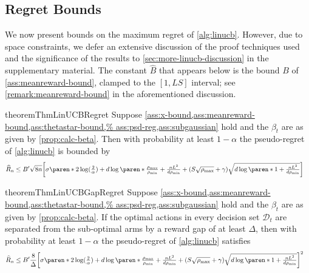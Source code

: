 \documentclass{article}
\DeclarePairedDelimiter{\paren}()
\DeclarePairedDelimiter{\brck}{[}{]}
\newcommand{\D}{\mathcal{D}}
\begin{document}
\vspace{-5pt}
\subsection{Regret Bounds}
\label{sec:regret-bounds}

We now present bounds on the maximum regret of \cref{alg:linucb}.
However, due to space constraints, we defer an extensive discussion of
the proof techniques used and the significance of the results to
\cref{sec:more-linucb-discussion} in the supplementary material.  The
constant $\hat{B}$ that appears below is the bound $B$ of
\cref{ass:meanreward-bound}, clamped to the $[1,LS]$ interval; see \cref{remark:meanreward-bound} in the aforementioned discussion.

\begin{restatable}{theorem}{ThmLinUCBRegret}%
  \label{thm:linucb-regret}%
  Suppose \cref{ass:x-bound,ass:meanreward-bound,ass:thetastar-bound,%
    ass:psd-reg,ass:subgaussian} hold and the
  $\beta_t$ are as given by \cref{prop:calc-beta}.  Then with
  probability at least $1-\alpha$ the pseudo-regret of
  \cref{alg:linucb} is bounded by
    \begin{align}
    \label{eq:regret_general_formula}
    \widehat R_n
    &\le B' \sqrt{8n}\brck[\bigg]{\sigma\paren*{2\log(\tfrac{2}{\alpha})
      + d\log\paren*{\tfrac{\rho_{\max}}{\rho_{\min}} + \tfrac{nL^2}{d\rho_{\min}}}}
      + (S\sqrt{\rho_{\max}} + \gamma)\sqrt{d\log\paren*{1 + \tfrac{nL^2}{d\rho_{\min}}}}}
  \end{align}
\end{restatable}

\begin{restatable}{theorem}{ThmLinUCBGapRegret}%
  \label{thm:linucb-gap-regret}
  Suppose \cref{ass:x-bound,ass:meanreward-bound,ass:thetastar-bound,%
    ass:psd-reg,ass:subgaussian} hold and the
  $\beta_t$ are as given by \cref{prop:calc-beta}.  If the optimal
  actions in every decision set $\D_t$ are separated from the
  sub-optimal arms by a reward gap of at least $\Delta$, then with
  probability at least $1-\alpha$ the pseudo-regret of
  \cref{alg:linucb} satisfies
  \begin{align}
  \label{eq:regret_gap_general_formula}
    \widehat R_n
    &\le B' \frac{8}{\Delta} \brck[\bigg]{\sigma\paren*{2\log(\tfrac{2}{\alpha})
      + d\log\paren*{\tfrac{\rho_{\max}}{\rho_{\min}} + \tfrac{nL^2}{d\rho_{\min}}}}
      + (S\sqrt{\rho_{\max}}+\gamma)\sqrt{d\log\paren*{1+\tfrac{nL^2}{d\rho_{\min}}}}}^2
  \end{align}
\end{restatable}
\end{document}
